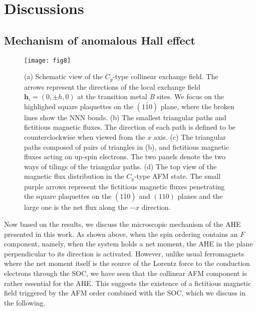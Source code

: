 \documentclass[aps,twocolumn,prb,preprintnumbers,amsmath,amssymb]{revtex4-2}
\begin{document}
\section{Discussions}\label{Discussions}

\subsection{Mechanism of anomalous Hall effect}\label{mechanism}
\begin{figure*}[t]
\begin{center}
\texttt{[image: fig8]}
\end{center}
\caption{(a) Schematic view of the $C_y$-type collinear exchange field. 
The arrows represent the directions of the local exchange field ${\bm h}_i = (0, \pm h, 0)$ at the transition metal {\it B} sites. 
We focus on the highlighed square plaquettes on the $(1\bar{1}0)$ plane, where the broken lines show the NNN bonds.
(b) The smallest triangular paths and fictitious magnetic fluxes. 
The direction of each path is defined to be counterclockwise when viewed from the $x$ axis.
(c) The 
triangular paths composed of pairs of triangles in (b), and fictitious magnetic fluxes acting on up-spin electrons.
The two panels denote the two ways of tilings of the triangular paths.
(d) The top view of the magnetic flux distribution in the $C_y$-type AFM state. 
The small purple arrows represent the fictitious magnetic fluxes penetrating the square plaquettes on the $(1\bar{1}0)$ and $(110)$ planes and the large one is the net flux along the $-x$ direction. 
}
\label{fig8}
\end{figure*}

Now based on the results, 
 we discuss the microscopic mechanism of the AHE presented in this work. 
As shown above, when the spin ordering contains an $F$ component, namely, when the system holds a net moment, 
 the AHE in the plane perpendicular to its direction is activated. 
However, unlike usual ferromagnets where the net moment itself is the source of the Lorentz force 
 to the conduction electrons through the SOC, 
 we have seen that the collinear AFM component is rather essential for the AHE. 
This suggests the existence of a fictitious magnetic field triggered by the AFM order combined with the SOC, which we discuss in the following. 
\end{document}
